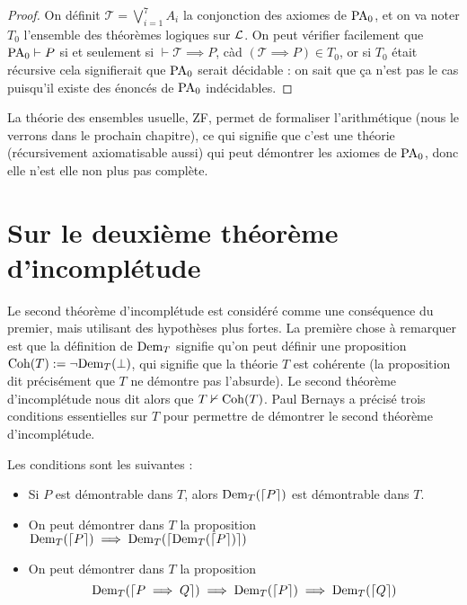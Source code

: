\begin{proof}
    On définit $\mathcal T = \bigvee_{i=1}^7 A_i$ la conjonction des axiomes de $\mathrm{PA}_0$, et on va noter $T_0$ l'ensemble des théorèmes logiques sur $\mathcal L$. On peut vérifier facilement que $\mathrm{PA}_0\vdash P$ si et seulement si $\vdash \mathcal T \implies P$, càd $(\mathcal T \implies P)\in T_0$, or si $T_0$ était récursive cela signifierait que $\mathrm{PA}_0$ serait décidable : on sait que ça n'est pas le cas puisqu'il existe des énoncés de $\mathrm{PA}_0$ indécidables.
\end{proof}

\begin{rmk}
    La théorie des ensembles usuelle, ZF, permet de formaliser l'arithmétique (nous le verrons dans le prochain chapitre), ce qui signifie que c'est une théorie (récursivement axiomatisable aussi) qui peut démontrer les axiomes de $\mathrm{PA}_0$, donc elle n'est elle non plus pas complète.
\end{rmk}

\section{Sur le deuxième théorème d'incomplétude}

Le second théorème d'incomplétude est considéré comme une conséquence du premier, mais utilisant des hypothèses plus fortes. La première chose à remarquer est que la définition de $\mathrm{Dem}_T$ signifie qu'on peut définir une proposition $\mathrm{Coh}(T) := \lnot \mathrm{Dem}_T(\bot)$, qui signifie que la théorie $T$ est cohérente (la proposition dit précisément que $T$ ne démontre pas l'absurde). Le second théorème d'incomplétude nous dit alors que $T\nvdash\mathrm{Coh}(T)$. Paul Bernays a précisé trois conditions essentielles sur $T$ pour permettre de démontrer le second théorème d'incomplétude.

\begin{defi}
    Les conditions sont les suivantes :
    \begin{itemize}[label=$\bullet$]
        \item Si $P$ est démontrable dans $T$, alors $\mathrm{Dem}_T(\lceil P \rceil)$ est démontrable dans $T$.
        \item On peut démontrer dans $T$ la proposition $\mathrm{Dem}_T(\lceil P \rceil)\implies \mathrm{Dem}_T(\lceil \mathrm{Dem}_T(\lceil P \rceil) \rceil)$
        \item On peut démontrer dans $T$ la proposition $$\mathrm{Dem}_T(\lceil P\implies Q \rceil)\implies \mathrm{Dem}_T(\lceil P \rceil)\implies \mathrm{Dem}_T(\lceil Q \rceil)$$
    \end{itemize}
\end{defi}

